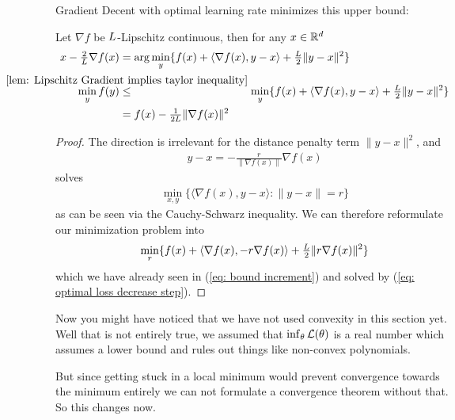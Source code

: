 Gradient Decent with optimal learning rate minimizes this upper bound:
%
\begin{lemma}\label{lem: smallest upper bound}
	Let \(\nabla f\) be \(L\)-Lipschitz continuous, then for any \(x\in\mathbb{R}^d\)
	\begin{subequations}
	\begin{align}
		x - \tfrac{2}{\ubound}\nabla f(x) 
		&= \arg\min_{y}\{
			f(x)+ \langle\nabla f(x), y-x\rangle + \tfrac{\ubound}{2}\|y-x\|^2 
		\}\\
		\label{eq: min approximation}
		\min_{y} f(y)	
		&\lxle{\ref{lem: Lipschitz Gradient implies taylor inequality}} \min_{y} \{
			f(x)+ \langle\nabla f(x), y-x\rangle + \tfrac{\ubound}{2}\|y-x\|^2 
		\} \\ \nonumber
		&= f(x) - \tfrac{1}{2\ubound} \|\nabla f(x)\|^2
	\end{align}
	\end{subequations}
\end{lemma}
\begin{proof}
	The direction is irrelevant for the distance penalty term \(\|y-x\|^2\), and
	\begin{align*}
		y-x = -\tfrac{r}{\|\nabla f(x)\|}\nabla f(x)
	\end{align*}	
	solves
	\begin{align*}
		\min_{x,y} \{\langle \nabla f(x), y-x \rangle : \|y-x\|=r \}
	\end{align*}
	as can be seen via the Cauchy-Schwarz inequality. We can  therefore
	reformulate our minimization problem into
	\begin{align*}
		\min_{r} \{ f(x) + \langle \nabla f(x), -r \nabla f(x)\rangle
		+ \tfrac{L}{2}\|r\nabla f(x)\|^2\}
	\end{align*}
	which we have already seen in (\ref{eq: bound increment}) and solved
	by (\ref{eq: optimal loss decrease step}).
\end{proof}

Now you might have noticed that we have not used convexity in this section yet.
Well that is not entirely true, we assumed that \(\inf_\theta\mathcal{L}(\theta)\)
is a real number which assumes a lower bound and rules out things like
non-convex polynomials.

But since getting stuck in a local minimum would prevent convergence towards the
minimum entirely we can not formulate a convergence theorem without that. So
this changes now.

